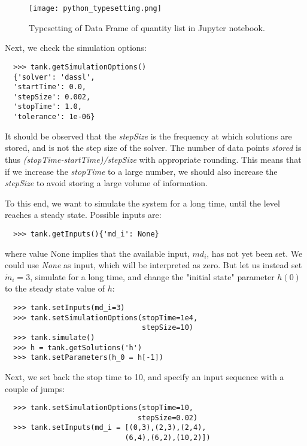\begin{figure}
	\texttt{[image: python\_typesetting.png]}
	\caption{Typesetting of Data Frame of quantity list in Jupyter notebook.}
	\label{fig:pythontypesetting}
\end{figure}

Next, we check the simulation options:

\begin{lstlisting}
  >>> tank.getSimulationOptions()
  {'solver': 'dassl',
  'startTime': 0.0,
  'stepSize': 0.002,
  'stopTime': 1.0,
  'tolerance': 1e-06}
\end{lstlisting}

It should be observed that the \textit{stepSize} is the frequency at which solutions are stored, and is not the step
size of the solver. The number of data points \textit{stored} is thus \textit{(stopTime-startTime)/stepSize} with appropriate
rounding. This means that if we increase the \textit{stopTime} to a large number, we should also increase the \textit{stepSize} to
avoid storing a large volume of information.


To this end, we want to simulate the system for a long time, until the level reaches a steady state. Possible inputs are:

\begin{lstlisting}
  >>> tank.getInputs(){'md_i': None}
\end{lstlisting}

where value None implies that the available input, $md_i$, has not yet been set. We could use \textit{None} as input, which will be interpreted as zero. 
But let us instead set $\dot{m}_i = 3$, simulate for a long time, and change the "initial state"
parameter $h (0)$ to the steady state value of $h$:

\begin{lstlisting}
  >>> tank.setInputs(md_i=3)
  >>> tank.setSimulationOptions(stopTime=1e4, 
                                stepSize=10)
  >>> tank.simulate()
  >>> h = tank.getSolutions('h')
  >>> tank.setParameters(h_0 = h[-1])
\end{lstlisting}

Next, we set back the stop time to 10, and specify an input sequence with a couple of jumps:

\begin{lstlisting}
  >>> tank.setSimulationOptions(stopTime=10, 
                               stepSize=0.02)
  >>> tank.setInputs(md_i = [(0,3),(2,3),(2,4),
                            (6,4),(6,2),(10,2)])
\end{lstlisting}

